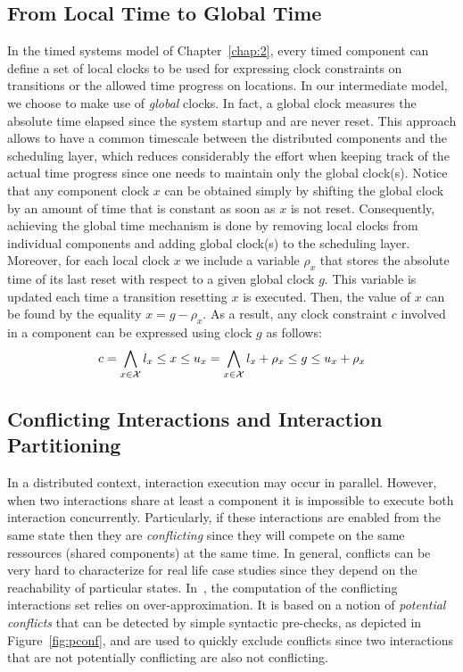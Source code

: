 \subsection{From Local Time to Global Time}
In the timed systems model of Chapter~\ref{chap:2}, every timed component can define a set of 
local clocks to be used for expressing clock constraints on transitions or the allowed time 
progress on locations. In our intermediate model, we choose to make use of \emph{global} clocks.
In fact, a global clock measures the absolute time elapsed since the system startup and are never
reset. This approach allows to have a common timescale between the distributed components
and the scheduling layer, which reduces considerably the effort when keeping track of the
actual time progress since one needs to maintain only the global clock(s). 
Notice that any component clock $x$ can be obtained simply by shifting the global clock by 
an amount of time that is constant as soon as $x$ is not reset. Consequently, achieving 
the global time mechanism is done by removing local clocks from individual components 
and adding global clock(s) to the scheduling layer. Moreover, for each local clock $x$
we include a variable $\rho_x$ that stores the absolute time of its last reset with respect
to a given global clock $g$. This variable is updated each time a transition resetting $x$ 
is executed. Then, the value of $x$ can be found by the equality $x=g-\rho_x$.  
As a result, any clock constraint $c$ involved in a component can be expressed using clock $g$
as follows:
\begin{displaymath}
  c=\bigwedge_{x\in\mathcal{X}} l_x\le x\le u_x=\bigwedge_{x\in\mathcal{X}}l_x+\rho_x\le g\le u_x+\rho_x
\end{displaymath}

\subsection{Conflicting Interactions and Interaction Partitioning}
\label{sub:conf}
In a distributed context, interaction execution may occur in parallel. However,
when two interactions share at least a component it is impossible to execute both
interaction concurrently. Particularly, if these interactions are enabled from the same state 
then they are \emph{conflicting} since they will compete on the same ressources (shared 
components) at the same time.
In general, conflicts can be very hard to characterize for real life case studies since 
they depend on the reachability of particular states. In~\cite{}, the computation of
the conflicting interactions set relies on over-approximation. It is based on a notion 
of \emph{potential conflicts} that can be detected by simple syntactic pre-checks, as depicted
in Figure~\ref{fig:pconf}, and are used to quickly exclude conflicts since two interactions
that are not potentially conflicting are also not conflicting. 

